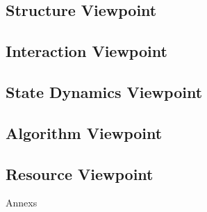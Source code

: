 \documentclass{article}
\begin{document}
\subsection{Structure Viewpoint}
\subsection{Interaction Viewpoint}
\subsection{State Dynamics Viewpoint}
\subsection{Algorithm Viewpoint}
\subsection{Resource Viewpoint}

Annexs
\end{document}

